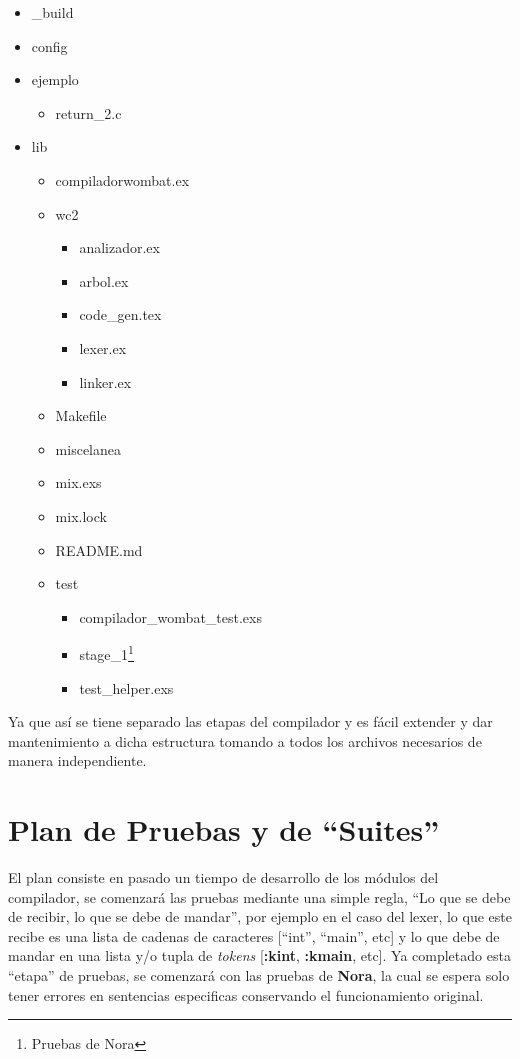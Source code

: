 \documentclass{article}
\begin{document}
\begin{itemize}
\item \_build
\item config
\item ejemplo
  \begin{itemize}
  \item return\_2.c
  \end{itemize}
\item lib
  \begin{itemize}
  \item compiladorwombat.ex
  \item wc2
    \begin{itemize}
    \item analizador.ex
    \item arbol.ex
    \item code\_gen.tex
    \item lexer.ex
    \item linker.ex
    \end{itemize}
  \item Makefile
  \item miscelanea
  \item mix.exs
  \item mix.lock
  \item README.md
  \item test
    \begin{itemize}
    \item compilador\_wombat\_test.exs
    \item stage\_1\footnote{Pruebas de Nora}
    \item test\_helper.exs
    \end{itemize}

  \end{itemize}

\end{itemize}

Ya que así se tiene separado las etapas del compilador y es fácil extender y dar mantenimiento a dicha
estructura tomando a todos los archivos necesarios de manera independiente.

\section{Plan de Pruebas y de ``Suites''}

El plan consiste en pasado un tiempo de desarrollo de los módulos del
compilador, se comenzará las pruebas mediante una  simple regla, ``Lo
que se debe de recibir, lo que se debe de mandar'', por ejemplo en el
caso del lexer, lo que este recibe es una lista de cadenas de caracteres
[``int'', ``main'', etc] y lo que debe de mandar en una lista y/o tupla de
\textit{tokens} [\textbf{:kint}, \textbf{:kmain}, etc]. Ya completado esta ``etapa''
de pruebas, se comenzará con las pruebas de \textbf{Nora}, la cual se espera solo
tener errores en sentencias especificas conservando el funcionamiento original.
\end{document}
